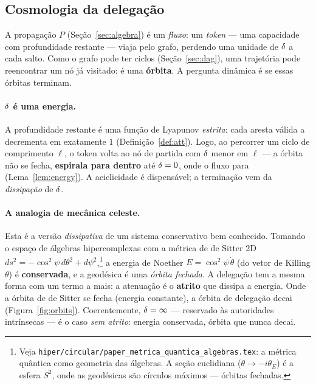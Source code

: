 \subsection{Cosmologia da delegação}\label{sec:orbits}

A propagação $P$ (Seção~\ref{sec:algebra}) é um \emph{fluxo}: um \emph{token}
--- uma capacidade com profundidade restante --- viaja pelo grafo, perdendo
uma unidade de $\delta$ a cada salto. Como o grafo pode ter ciclos
(Seção~\ref{sec:dag}), uma trajetória pode reencontrar um nó já visitado: é
uma \textbf{órbita}. A pergunta dinâmica é se essas órbitas terminam.

\paragraph{$\delta$ é uma energia.} A profundidade restante é uma função de
Lyapunov \emph{estrita}: cada aresta válida a decrementa em exatamente $1$
(Definição~\ref{def:att}). Logo, ao percorrer um ciclo de comprimento $\ell$,
o token volta ao nó de partida com $\delta$ menor em $\ell$ --- a órbita não se
fecha, \textbf{espirala para dentro} até $\delta=0$, onde o fluxo para
(Lema~\ref{lem:energy}). A aciclicidade é dispensável; a terminação vem da
\emph{dissipação} de $\delta$.

\paragraph{A analogia de mecânica celeste.} Esta é a versão \emph{dissipativa}
de um sistema conservativo bem conhecido. Tomando o espaço de álgebras
hipercomplexas com a métrica de de Sitter 2D
$ds^2=-\cos^2\psi\,d\theta^2+d\psi^2$,\footnote{Veja
\texttt{hiper/circular/paper\_metrica\_quantica\_algebras.tex}: a métrica
quântica como geometria das álgebras. A seção euclidiana ($\theta\to-i\theta_E$)
é a esfera $S^2$, onde as geodésicas são círculos máximos --- órbitas
fechadas.} a energia de Noether $E=\cos^2\psi\,\dot\theta$ (do vetor de Killing
$\theta$) é \textbf{conservada}, e a geodésica é uma \emph{órbita fechada}. A
delegação tem a mesma forma com um termo a mais: a atenuação é o
\textbf{atrito} que dissipa a energia. Onde a órbita de de Sitter se fecha
(energia constante), a órbita de delegação decai (Figura~\ref{fig:orbits}).
Coerentemente, $\delta=\infty$ --- reservado às autoridades intrínsecas --- é o
caso \emph{sem atrito}: energia conservada, órbita que nunca decai.

